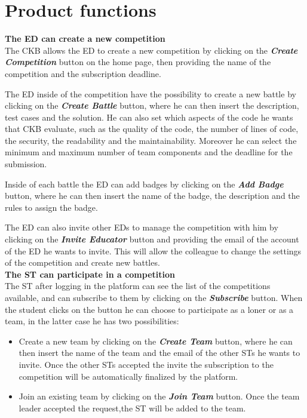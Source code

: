 \section{Product functions}
\label{s:Product_functions}%

\textbf{The ED can create a new competition} \\
The CKB allows the ED to create a new competition by clicking on the \textbf{\textit{Create Competition}} button on the home page, then providing the name of the competition and the subscription deadline.

The ED inside of the competition have the possibility to create a new battle by clicking on the \textbf{\textit{Create Battle}} button, where he can then insert the description, test cases and the solution. He can also set which aspects of the code he wants that CKB evaluate, such as the quality of the code, the number of lines of code, the security, the readability and the maintainability. Moreover he can select the minimum and maximum number of team components and the deadline for the submission.

Inside of each battle the ED can add badges by clicking on the \textbf{\textit{Add Badge}} button, where he can then insert the name of the badge, the description and the rules to assign the badge.

The ED can also invite other EDs to manage the competition with him by clicking on the \textbf{\textit{Invite Educator}} button and providing the email of the account of the ED he wants to invite. This will allow the colleague to change the settings of the competition and create new battles. \\

\textbf{The ST can participate in a competition} \\
The ST after logging in the platform can see the list of the competitions available, and can subscribe to them by clicking on the \textbf{\textit{Subscribe}} button. When the student clicks on the button he can choose to participate as a loner or as a team, in the latter case he has two possibilities: 
\begin{itemize}
  \item Create a new team by clicking on the \textbf{\textit{Create Team}} button, where he can then insert the name of the team and the email of the other STs he wants to invite. Once the other STs accepted the invite the subscription to the competition will be automatically finalized by the platform.
  \item Join an existing team by clicking on the \textbf{\textit{Join Team}} button. Once the team leader accepted the request,the ST will be added to the team.
\end{itemize}


